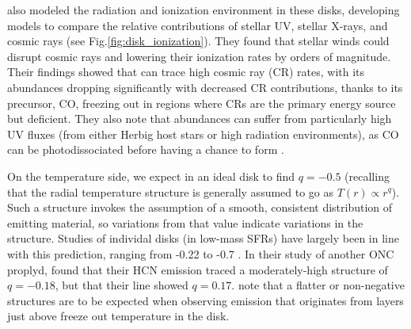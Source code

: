 \citet{Cleeves2013,Cleeves2014} also modeled the radiation and ionization environment in these disks, developing models to compare the relative contributions of stellar UV, stellar X-rays, and cosmic rays (see Fig.\ref{fig:disk_ionization}). They found that stellar winds could disrupt cosmic rays and lowering their ionization rates by orders of magnitude. Their findings showed that \hco can trace high cosmic ray (CR) rates, with its abundances dropping significantly with decreased CR contributions, thanks to its precursor, CO, freezing out in regions where CRs are the primary energy source but deficient. They also note that \hco abundances can suffer from particularly high UV fluxes (from either Herbig host stars or high radiation environments), as CO can be photodissociated before having a chance to form \hco. %


On the temperature side, we expect in an ideal disk to find $q=-0.5$ (recalling that the radial temperature structure is generally assumed to go as $T(r) \propto r^{q}$). Such a structure invokes the assumption of a smooth, consistent distribution of emitting material, so variations from that value indicate variations in the structure. Studies of individal disks (in low-mass SFRs) have largely been in line with this prediction, ranging from -0.22 \citep{Flaherty2015} to -0.7 \citep{Chapillon2008}. In their study of another ONC proplyd, \citet{Factor2017} found that their HCN emission traced a moderately-high structure of $q=-0.18$, but that their \hco line showed $q=0.17$. \citet{Schwarz2016} note that a flatter or non-negative structures are to be expected when observing emission that originates from layers just above freeze out temperature in the disk.



